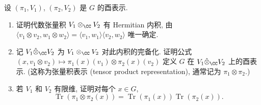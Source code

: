 \begin{exercise}[张量积表示]
\label{ex:III.6.2.1}
设 $(\pi_1, V_1)$, $(\pi_2, V_2)$ 是 $G$ 的酉表示.
\begin{enumerate}
\item[(a)] 证明代数张量积 $V_1 \otimes_{\CC}V_2$ 有 Hermitian 内积, 由 $\langle v_1 \otimes v_2, w_1 \otimes w_2 \rangle = \langle v_1, w_1 \rangle\langle v_2, w_2 \rangle$ 唯一确定.
\item[(b)] 记 $V_1 \hat{\otimes}_{\CC}V_2$ 为 $V_1 \otimes_{\CC}V_2$ 对此内积的完备化. 证明公式 $(x, v_1 \otimes v_2) \longmapsto \pi_1(x)(v_1) \otimes \pi_2(x)(v_2)$ 定义 $G$ 在 $V_1 \hat{\otimes}_{\CC}V_2$ 上的酉表示. (这称为张量积表示 (tensor product representation), 通常记为 $\pi_1 \otimes \pi_2$.)
\item[(c)] 若 $V_1$ 和 $V_2$ 有限维, 证明对每个 $x \in G$,
\[
\operatorname{Tr}(\pi_1 \otimes \pi_2(x)) = \operatorname{Tr}(\pi_1(x))\operatorname{Tr}(\pi_2(x)).
\]
\end{enumerate}
\end{exercise}

